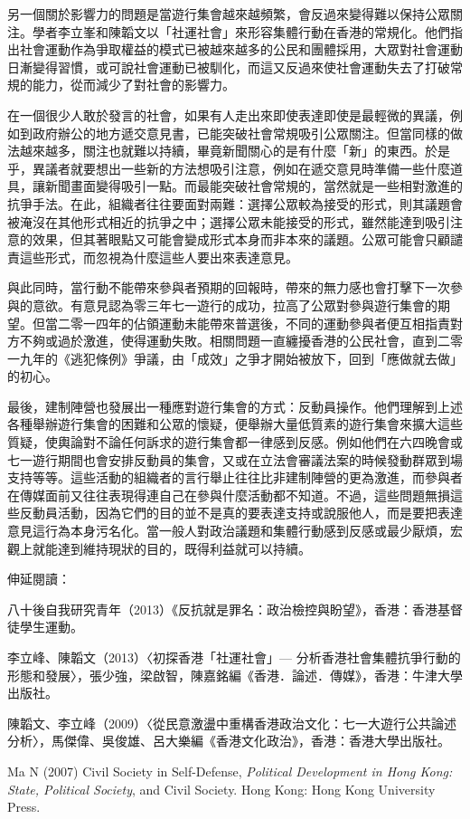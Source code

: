 另一個關於影響力的問題是當遊行集會越來越頻繁，會反過來變得難以保持公眾關注。學者李立峯和陳韜文以「社運社會」來形容集體行動在香港的常規化。他們指出社會運動作為爭取權益的模式已被越來越多的公民和團體採用，大眾對社會運動日漸變得習慣，或可說社會運動已被馴化，而這又反過來使社會運動失去了打破常規的能力，從而減少了對社會的影響力。

在一個很少人敢於發言的社會，如果有人走出來即使表達即使是最輕微的異議，例如到政府辦公的地方遞交意見書，已能突破社會常規吸引公眾關注。但當同樣的做法越來越多，關注也就難以持續，畢竟新聞關心的是有什麼「新」的東西。於是乎，異議者就要想出一些新的方法想吸引注意，例如在遞交意見時準備一些什麼道具，讓新聞畫面變得吸引一點。而最能突破社會常規的，當然就是一些相對激進的抗爭手法。在此，組織者往往要面對兩難：選擇公眾較為接受的形式，則其議題會被淹沒在其他形式相近的抗爭之中；選擇公眾未能接受的形式，雖然能達到吸引注意的效果，但其著眼點又可能會變成形式本身而非本來的議題。公眾可能會只顧譴責這些形式，而忽視為什麼這些人要出來表達意見。

與此同時，當行動不能帶來參與者預期的回報時，帶來的無力感也會打擊下一次參與的意欲。有意見認為零三年七一遊行的成功，拉高了公眾對參與遊行集會的期望。但當二零一四年的佔領運動未能帶來普選後，不同的運動參與者便互相指責對方不夠或過於激進，使得運動失敗。相關問題一直纏擾香港的公民社會，直到二零一九年的《逃犯條例》爭議，由「成效」之爭才開始被放下，回到「應做就去做」的初心。

最後，建制陣營也發展出一種應對遊行集會的方式：反動員操作。他們理解到上述各種舉辦遊行集會的困難和公眾的懷疑，便舉辦大量低質素的遊行集會來擴大這些質疑，使輿論對不論任何訴求的遊行集會都一律感到反感。例如他們在六四晚會或七一遊行期間也會安排反動員的集會，又或在立法會審議法案的時候發動群眾到場支持等等。這些活動的組織者的言行舉止往往比非建制陣營的更為激進，而參與者在傳媒面前又往往表現得連自己在參與什麼活動都不知道。不過，這些問題無損這些反動員活動，因為它們的目的並不是真的要表達支持或說服他人，而是要把表達意見這行為本身污名化。當一般人對政治議題和集體行動感到反感或最少厭煩，宏觀上就能達到維持現狀的目的，既得利益就可以持續。



伸延閱讀：

八十後自我研究青年（2013）《反抗就是罪名：政治檢控與盼望》，香港：香港基督徒學生運動。

李立峰、陳韜文（2013）〈初探香港「社運社會」— 分析香港社會集體抗爭行動的形態和發展〉，張少強，梁啟智，陳嘉銘編《香港．論述．傳媒》，香港：牛津大學出版社。

陳韜文、李立峰（2009）〈從民意激盪中重構香港政治文化：七一大遊行公共論述分析〉，馬傑偉、吳俊雄、呂大樂編《香港文化政治》，香港：香港大學出版社。

Ma N (2007) Civil Society in Self-Defense, \textit{Political Development in Hong Kong: State, Political Society}, and Civil Society. Hong Kong: Hong Kong University Press.
